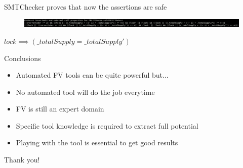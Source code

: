 \documentclass[aspectratio=169,10pt]{beamer}
\begin{document}
\begin{frame}[fragile]
\begin{center}
SMTChecker proves that now the assertions are safe
\begin{figure}
	\includegraphics[scale=0.23]{images/erc777_pass_smtchecker_invariants}
\end{figure}
$lock \implies (\_totalSupply = \_totalSupply')$
\end{center}
\end{frame}

\begin{frame}[fragile]
\begin{center}
Conclusions
\begin{itemize}
\item Automated FV tools can be quite powerful but...
\item No automated tool will do the job everytime
\item FV is still an expert domain
\item Specific tool knowledge is required to extract full potential
\item Playing with the tool is essential to get good results
\end{itemize}
\end{center}
\end{frame}

\begin{frame}
\begin{center}
Thank you!
\end{center}
\end{frame}
 
\end{document}
